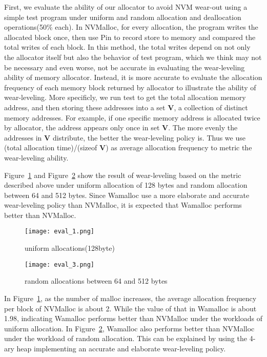 \documentclass{vldb}
\begin{document}
First, we evaluate the ability of our allocator to avoid NVM wear-out using a simple test program under uniform and random allocation and deallocation operations(50\% each).
In NVMalloc, for every allocation, the program writes the allocated block once, then use Pin\cite{luk2005pin} to record store to memory and compared the total writes of each block.
In this method, the total writes depend on not only the allocator itself but also the behavior of test program,
which we think may not be necessary and even worse, not be accurate in evaluating the wear-leveling ability of memory allocator.
Instead, it is more accurate to evaluate the allocation frequency of each memory block returned by allocator to illustrate the ability of wear-leveling.
More specificly, we run test to get the total allocation memory address, and then storing these addresses into a set \textbf{V},
a collection of distinct memory addresses.
For example, if one specific memory address is allocated twice by allocator, the address appears only once in set \textbf{V}.
The more evenly the addresses in \textbf{V} distribute, the better the wear-leveling policy is.
Thus we use (total allocation time)/(sizeof \textbf{V}) as average allocation frequency to metric the wear-leveling ability.

Figure~\ref{fig:eval_1} and Figure~\ref{fig:eval_3} show the result of wear-leveling based on the metric described above
under uniform allocation of 128 bytes and random allocation between 64 and 512 bytes.
Since Wamalloc use a more elaborate and accurate wear-leveling policy than NVMalloc,
it is expected that Wamalloc performs better than NVMalloc.

\begin{figure}[t]
\centering
\texttt{[image: eval\_1.png]}
\caption{uniform allocations(128byte)}
\label{fig:eval_1}
\end{figure}

\begin{figure}[t]
\centering
\texttt{[image: eval\_3.png]}
\caption{random allocations between 64 and 512 bytes}
\label{fig:eval_3}
\end{figure}

In Figure~\ref{fig:eval_1}, as the number of malloc increases,
the average allocation frequency per block of NVMalloc is about 2.
While the value of that in Wamalloc is about 1.98, 
indicating Wamalloc performs better than NVMalloc under the workloads of uniform allocation.
In Figure~\ref{fig:eval_3},
Wamalloc also performs better than NVMalloc under the workload of random allocation.
This can be explained by using the 4-ary heap implementing an accurate and elaborate wear-leveling policy.
\end{document}
